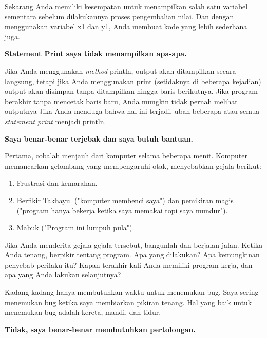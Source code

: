 \documentclass[12pt,b5paper,openright,twoside]{book}
\begin{document}
\noindent Sekarang Anda memiliki kesempatan untuk menampilkan salah satu variabel sementara sebelum dilakukannya proses pengembalian nilai. Dan dengan menggunakan variabel x1 dan y1, Anda membuat kode yang lebih sederhana juga.

\noindent \textbf{Statement Print saya tidak menampilkan apa-apa.}

\noindent Jika Anda menggunakan \textit{method} println, output akan ditampilkan secara langsung, tetapi jika Anda menggunakan print (setidaknya di beberapa kejadian) output akan disimpan tanpa ditampilkan hingga baris berikutnya. Jika program berakhir tanpa mencetak baris baru, Anda mungkin tidak pernah melihat outputnya
Jika Anda menduga bahwa hal ini terjadi, ubah beberapa atau semua \textit{statement print} menjadi println.

\noindent \textbf{Saya benar-benar terjebak dan saya butuh bantuan.}

\noindent Pertama, cobalah menjauh dari komputer selama beberapa menit. Komputer memancarkan gelombang yang mempengaruhi otak, menyebabkan gejala berikut:
\begin{enumerate}
    \item Frustrasi dan kemarahan.
    \item Berfikir Takhayul ("komputer membenci saya") dan pemikiran magis ("program hanya bekerja ketika saya memakai topi saya mundur").
    \item Mabuk ("Program ini lumpuh pula").
\end{enumerate}

\noindent Jika Anda menderita gejala-gejala tersebut, bangunlah dan berjalan-jalan. Ketika Anda tenang, berpikir tentang program. Apa yang dilakukan? Apa kemungkinan penyebab perilaku itu? Kapan terakhir kali Anda memiliki program kerja, dan apa yang Anda lakukan selanjutnya?

\noindent Kadang-kadang hanya membutuhkan waktu untuk menemukan bug. Saya sering menemukan bug ketika saya membiarkan pikiran tenang. Hal yang baik untuk menemukan bug adalah kereta, mandi, dan tidur.

\noindent \textbf{Tidak, saya benar-benar membutuhkan pertolongan.}
\end{document}
